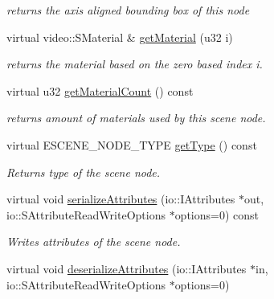 \begin{DoxyCompactItemize}
\begin{DoxyCompactList}\small\item\em returns the axis aligned bounding box of this node \end{DoxyCompactList}\item 
virtual video\-::\-S\-Material \& \hyperlink{classirr_1_1scene_1_1_c_volume_light_scene_node_a945c5c6f9002f2b0d130058e327e9972}{get\-Material} (u32 i)
\begin{DoxyCompactList}\small\item\em returns the material based on the zero based index i. \end{DoxyCompactList}\item 
\hypertarget{classirr_1_1scene_1_1_c_volume_light_scene_node_a54e26fa3b0d2a8aeb589ee9a5d62ff0a}{virtual u32 \hyperlink{classirr_1_1scene_1_1_c_volume_light_scene_node_a54e26fa3b0d2a8aeb589ee9a5d62ff0a}{get\-Material\-Count} () const }\label{classirr_1_1scene_1_1_c_volume_light_scene_node_a54e26fa3b0d2a8aeb589ee9a5d62ff0a}

\begin{DoxyCompactList}\small\item\em returns amount of materials used by this scene node. \end{DoxyCompactList}\item 
\hypertarget{classirr_1_1scene_1_1_c_volume_light_scene_node_aba5a5fd13ec1fc4050bc88411f73732b}{virtual E\-S\-C\-E\-N\-E\-\_\-\-N\-O\-D\-E\-\_\-\-T\-Y\-P\-E \hyperlink{classirr_1_1scene_1_1_c_volume_light_scene_node_aba5a5fd13ec1fc4050bc88411f73732b}{get\-Type} () const }\label{classirr_1_1scene_1_1_c_volume_light_scene_node_aba5a5fd13ec1fc4050bc88411f73732b}

\begin{DoxyCompactList}\small\item\em Returns type of the scene node. \end{DoxyCompactList}\item 
\hypertarget{classirr_1_1scene_1_1_c_volume_light_scene_node_a93c45f5b4cef67652dc895acbed3124e}{virtual void \hyperlink{classirr_1_1scene_1_1_c_volume_light_scene_node_a93c45f5b4cef67652dc895acbed3124e}{serialize\-Attributes} (io\-::\-I\-Attributes $\ast$out, io\-::\-S\-Attribute\-Read\-Write\-Options $\ast$options=0) const }\label{classirr_1_1scene_1_1_c_volume_light_scene_node_a93c45f5b4cef67652dc895acbed3124e}

\begin{DoxyCompactList}\small\item\em Writes attributes of the scene node. \end{DoxyCompactList}\item 
\hypertarget{classirr_1_1scene_1_1_c_volume_light_scene_node_ae2eb89bf1a93448b17df0510a863e59b}{virtual void \hyperlink{classirr_1_1scene_1_1_c_volume_light_scene_node_ae2eb89bf1a93448b17df0510a863e59b}{deserialize\-Attributes} (io\-::\-I\-Attributes $\ast$in, io\-::\-S\-Attribute\-Read\-Write\-Options $\ast$options=0)}\label{classirr_1_1scene_1_1_c_volume_light_scene_node_ae2eb89bf1a93448b17df0510a863e59b}


\end{DoxyCompactItemize}
